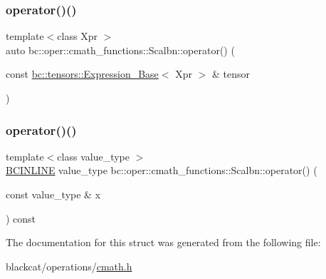 \mbox{\label{structbc_1_1oper_1_1cmath__functions_1_1Scalbn_ae83112663ec2b38554365d2cca57603b}} 
\subsubsection{\texorpdfstring{operator()()}{operator()()}\hspace{0.1cm}{\footnotesize\ttfamily [2/3]}}
{\footnotesize\ttfamily template$<$class Xpr $>$ \\
auto bc\+::oper\+::cmath\+\_\+functions\+::\+Scalbn\+::operator() (\begin{DoxyParamCaption}\item[{const \hyperlink{classbc_1_1tensors_1_1Expression__Base}{bc\+::tensors\+::\+Expression\+\_\+\+Base}$<$ Xpr $>$ \&}]{tensor }\end{DoxyParamCaption})\hspace{0.3cm}{\ttfamily [inline]}}

\mbox{\label{structbc_1_1oper_1_1cmath__functions_1_1Scalbn_ab45821eefa3f8f78c54fa7bd5a9a31a7}} 
\subsubsection{\texorpdfstring{operator()()}{operator()()}\hspace{0.1cm}{\footnotesize\ttfamily [3/3]}}
{\footnotesize\ttfamily template$<$class value\+\_\+type $>$ \\
\hyperlink{common_8h_a6699e8b0449da5c0fafb878e59c1d4b1}{B\+C\+I\+N\+L\+I\+NE} value\+\_\+type bc\+::oper\+::cmath\+\_\+functions\+::\+Scalbn\+::operator() (\begin{DoxyParamCaption}\item[{const value\+\_\+type \&}]{x }\end{DoxyParamCaption}) const\hspace{0.3cm}{\ttfamily [inline]}}



The documentation for this struct was generated from the following file\+:\begin{DoxyCompactItemize}
\item 
blackcat/operations/\hyperlink{cmath_8h}{cmath.\+h}\end{DoxyCompactItemize}
